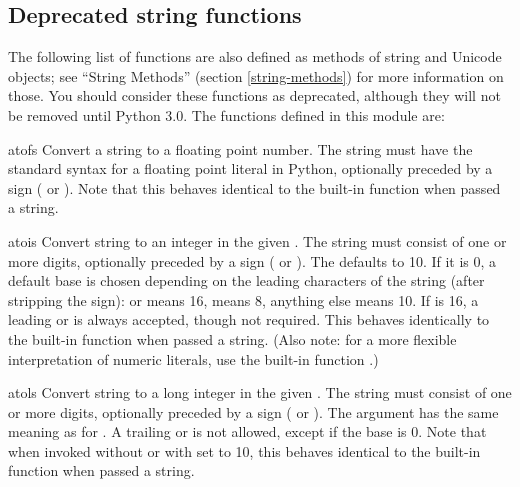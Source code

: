 \subsection{Deprecated string functions}

The following list of functions are also defined as methods of string and
Unicode objects; see ``String Methods'' (section
\ref{string-methods}) for more information on those.  You should consider
these functions as deprecated, although they will not be removed until Python
3.0.  The functions defined in this module are:

\begin{funcdesc}{atof}{s}
  Convert a string to a floating point number.  The string must have
  the standard syntax for a floating point literal in Python,
  optionally preceded by a sign (\samp{+} or \samp{-}).  Note that
  this behaves identical to the built-in function
   when passed a string.

\end{funcdesc}

\begin{funcdesc}{atoi}{s}
  Convert string  to an integer in the given .  The
  string must consist of one or more digits, optionally preceded by a
  sign (\samp{+} or \samp{-}).  The  defaults to 10.  If it
  is 0, a default base is chosen depending on the leading characters
  of the string (after stripping the sign):  or 
  means 16,  means 8, anything else means 10.  If 
  is 16, a leading  or  is always accepted, though
  not required.  This behaves identically to the built-in function
   when passed a string.  (Also note: for a more
  flexible interpretation of numeric literals, use the built-in
  function .)
\end{funcdesc}

\begin{funcdesc}{atol}{s}
  Convert string  to a long integer in the given .
  The string must consist of one or more digits, optionally preceded
  by a sign (\samp{+} or \samp{-}).  The  argument has the
  same meaning as for .  A trailing  or
   is not allowed, except if the base is 0.  Note that when
  invoked without  or with  set to 10, this
  behaves identical to the built-in function
   when passed a string.
\end{funcdesc}

